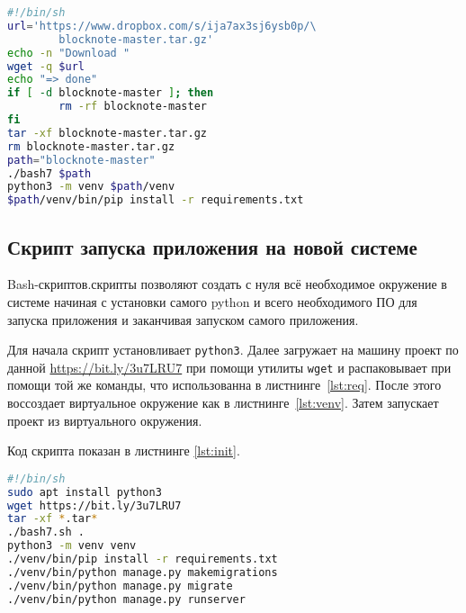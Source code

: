 \begin{lstlisting}[language=Bash
	, caption=\leftline{Создание виртуального окружения}
	, label=lst:venv]
#!/bin/sh
url='https://www.dropbox.com/s/ija7ax3sj6ysb0p/\
        blocknote-master.tar.gz'
echo -n "Download "
wget -q $url
echo "=> done"
if [ -d blocknote-master ]; then
        rm -rf blocknote-master
fi
tar -xf blocknote-master.tar.gz
rm blocknote-master.tar.gz
path="blocknote-master"
./bash7 $path
python3 -m venv $path/venv
$path/venv/bin/pip install -r requirements.txt
\end{lstlisting}
\subsection{Скрипт запуска приложения на новой системе}
Bash-скриптов.скрипты позволяют создать с нуля всё необходимое окружение в
системе начиная с установки самого python и всего необходимого ПО для
запуска приложения и заканчивая запуском самого приложения.\par
Для начала скрипт установливает \texttt{python3}.
Далее загружает на машину проект по данной \url{https://bit.ly/3u7LRU7}
при помощи утилиты \texttt{wget} и распаковывает при помощи той же команды,
что использованна в листнинге~\ref{lst:req}.
После этого воссоздает виртуальное окружение как в листнинге~\ref{lst:venv}.
Затем запускает проект из виртуального окружения.\par
Код скрипта показан в листнинге \ref{lst:init}.

\begin{lstlisting}[language=Bash
	, caption=\leftline{Создание стартового скрипта}
	, label=lst:init]
#!/bin/sh
sudo apt install python3
wget https://bit.ly/3u7LRU7
tar -xf *.tar*
./bash7.sh .
python3 -m venv venv
./venv/bin/pip install -r requirements.txt
./venv/bin/python manage.py makemigrations
./venv/bin/python manage.py migrate
./venv/bin/python manage.py runserver
\end{lstlisting}

